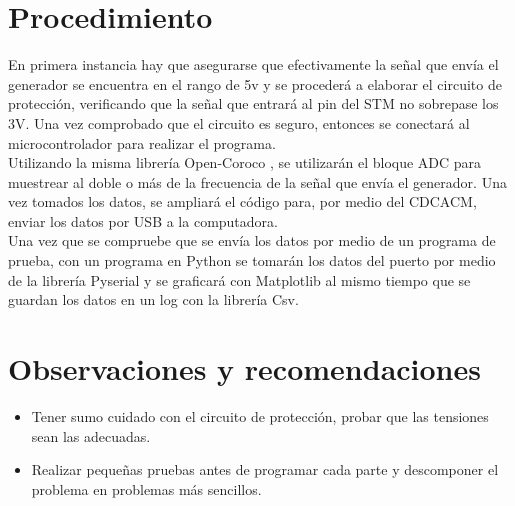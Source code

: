 \documentclass[letterpaper]{article}
\begin{document}
\section{Procedimiento}

En primera instancia hay que asegurarse que efectivamente la señal que envía el generador se encuentra en el rango de 5v y se procederá a elaborar el circuito de protección, verificando que la señal que entrará al pin del STM no sobrepase los 3V. Una vez comprobado que el circuito es seguro, entonces se conectará al microcontrolador para realizar el programa. \\[0.5cm] 
Utilizando la misma librería Open-Coroco \cite{coroco}, se utilizarán el bloque ADC para muestrear al doble o más de la frecuencia de la señal que envía el generador. Una vez tomados los datos, se ampliará el código para, por medio del CDCACM, enviar los datos por USB a la computadora. \\[0.5cm] 
Una vez que se compruebe que se envía los datos por medio de un programa de prueba, con un programa en Python se tomarán los datos del puerto por medio de la librería Pyserial y se graficará con Matplotlib al mismo tiempo que se guardan los datos en un log con la librería Csv.

\section{Observaciones y recomendaciones}

\begin{itemize}
\item Tener sumo cuidado con el circuito de protección, probar que las tensiones sean las adecuadas.
\item Realizar pequeñas pruebas antes de programar cada parte y descomponer el problema en problemas más sencillos.
\end{itemize}

 

\end{document}
